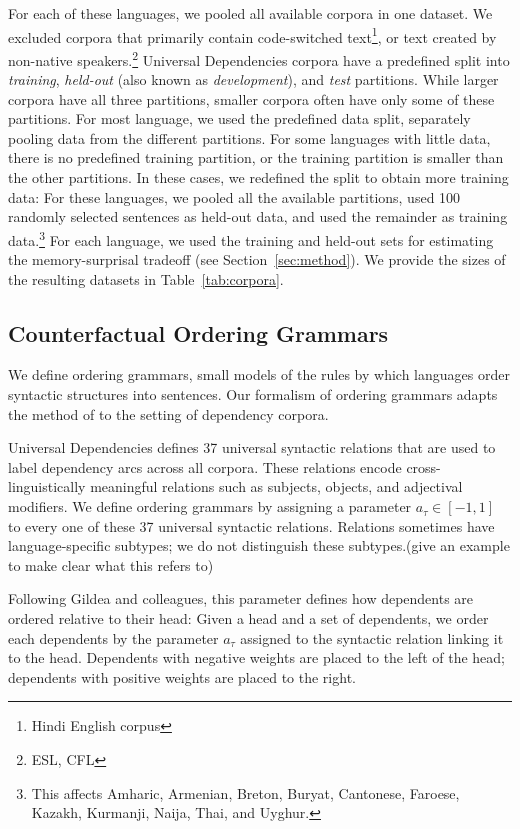 \documentclass[11pt,letterpaper]{article}
\newcommand\mhahn[1]{{\color{red}(#1)}}
\begin{document}
For each of these languages, we pooled all available corpora in one dataset.
We excluded corpora that primarily contain code-switched text\footnote{Hindi English corpus}, or text created by non-native speakers.\footnote{ESL, CFL}
Universal Dependencies corpora have a predefined split into \emph{training}, \emph{held-out} (also known as \emph{development}), and \emph{test} partitions.
While larger corpora have all three partitions, smaller corpora often have only some of these partitions.
For most language, we used the predefined data split, separately pooling data from the different partitions. %
For some languages with little data, there is no predefined training partition, or the training partition is smaller than the other partitions.
In these cases, we redefined the split to obtain more training data:
For these languages, we pooled all the available partitions, used 100 randomly selected sentences as held-out data, and used the remainder as training data.\footnote{This affects Amharic, Armenian, Breton, Buryat, Cantonese, Faroese, Kazakh, Kurmanji, Naija, Thai, and Uyghur.}
For each language, we used the training and held-out sets for estimating the memory-surprisal tradeoff (see Section~\ref{sec:method}).
We provide the sizes of the resulting datasets in Table~\ref{tab:corpora}.



\subsection{Counterfactual Ordering Grammars}
We define ordering grammars, small models of the rules by which languages order syntactic structures into sentences.
Our formalism of ordering grammars adapts the method of \cite{gildea-optimizing-2007, gildea-grammars-2010, gildea-human-2015} to the setting of dependency corpora.

Universal Dependencies defines 37 universal syntactic relations that are used to label dependency arcs across all corpora.
These relations encode cross-linguistically meaningful relations such as subjects, objects, and adjectival modifiers.
We define ordering grammars by assigning a parameter $a_\tau \in [-1,1]$ to every one of these 37 universal syntactic relations.
Relations sometimes have language-specific subtypes; we do not distinguish these subtypes.\mhahn{give an example to make clear what this refers to}

Following Gildea and colleagues, this parameter defines how dependents are ordered relative to their head:
Given a head and a set of dependents, we order each dependents by the parameter $a_\tau$ assigned to the syntactic relation linking it to the head.
Dependents with negative weights are placed to the left of the head; dependents with positive weights are placed to the right.
\end{document}

